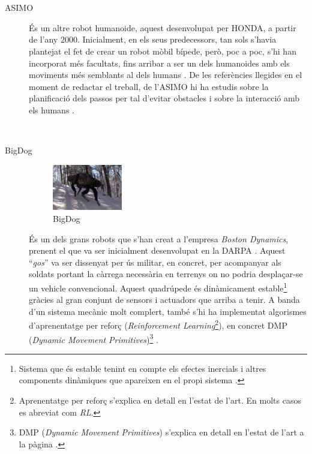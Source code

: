 \documentclass[12pt,a4paper,final,twoside]{article}
\begin{document}
\begin{description}
\paragraph{}$ $%

\item[ASIMO]
\begin{minipage}[t]{0.94\linewidth}

És un altre robot humanoide, aquest desenvolupat per HONDA, a partir de l'any 2000. Inicialment, en els seus predecessors, tan sols s'havia plantejat el fet de crear un robot mòbil bípede, però, poc a poc, s'hi han incorporat més facultats, fins arribar a ser un dels humanoides amb els moviments més semblants al dels humans \cite{ASIMO_History}. De les referències llegides en el moment de redactar el treball, de l'ASIMO hi ha estudis sobre la planificació dels passos per tal d'evitar obstacles \cite{Chestnutt2005} i sobre la interacció amb els humans \cite{Mutlu2006}.
\end{minipage}\\

\item[BigDog]
\begin{minipage}[t]{0.94\linewidth}
	\begin{figure}
	    \centering
		\includegraphics[width=0.30\textwidth]{Imatges/BigDog}
                \caption{BigDog \cite{Raibert2008}}
	\end{figure}
És un dels grans robots que s'han creat a l'empresa \textit{Boston Dynamics}, prenent el que va ser inicialment desenvolupat en la DARPA \cite{Raibert2008}. Aquest ``\textit{gos}'' va ser dissenyat per ús militar, en concret, per acompanyar als soldats portant la càrrega necessària en terrenys on no podria desplaçar-se un vehicle convencional. Aquest quadrúpede és dinàmicament estable\footnote{Sistema que és estable tenint en compte els efectes inercials i altres components dinàmiques que apareixen en el propi sistema \cite{Purushotham2009}.} gràcies al gran conjunt de sensors i actuadors que arriba a tenir. A banda d'un sistema mecànic molt complert, també s'hi ha implementat algorismes d'aprenentatge per reforç (\textit{Reinforcement Learning}\footnote{Aprenentatge per reforç s'explica en detall en l'estat de l'art. En molts casos es abreviat com \textit{RL}.}), en concret DMP (\textit{Dynamic Movement Primitives})\footnote{DMP (\textit{Dynamic Movement Primitives}) s'explica en detall en l'estat de l'art a la pàgina \pageref{DMP-estat-de-l'art}. } \cite{Raibert2008}.
\end{minipage}


\end{description}
\end{document}
